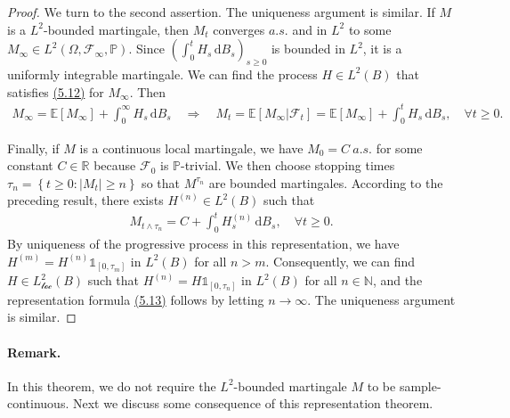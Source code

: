 \documentclass{article}
\numberwithin{equation}{section}
\newcommand{\E}{\mathbb{E}}
\renewcommand{\P}{\mathbb{P}}
\renewcommand{\d}{\mathrm{d}}
\theoremstyle{plain}
\theoremstyle{definition}
\begin{document}
\begin{proof}
We turn to the second assertion. The uniqueness argument is similar. If $M$ is a $L^2$-bounded martingale, then $M_t$ converges $a.s.$ and in $L^2$ to some $M_\infty\in L^2(\Omega,\mathscr{F}_\infty,\P)$. Since $(\int_0^t H_s\,\d B_s)_{s\geq 0}$ is bounded in $L^2$, it is a uniformly integrable martingale. We can find the process $H\in L^2(B)$ that satisfies \hyperref[eq:5.12]{(5.12)} for $M_\infty$. Then
\begin{align*}
	M_\infty = \E[M_\infty] + \int_0^\infty H_s\,\d B_s\quad\Rightarrow\quad M_t = \E[M_\infty|\mathscr{F}_t] = \E[M_\infty]+\int_0^t H_s\,\d B_s,\quad \forall t\geq 0.
\end{align*}

Finally, if $M$ is a continuous local martingale, we have $M_0=C\ a.s.$ for some constant $C\in\mathbb{R}$ because $\mathscr{F}_0$ is $\P$-trivial. We then choose stopping times $\tau_n=\left\{t\geq 0:\vert M_t\vert\geq n\right\}$ so that $M^{\tau_n}$ are bounded martingales. According to the preceding result, there exists $H^{(n)}\in L^2(B)$ such that
\begin{align*}
	M_{t\wedge\tau_n} = C + \int_0^t H^{(n)}_s\,\d B_s,\quad\forall t\geq 0.
\end{align*}
By uniqueness of the progressive process in this representation, we have $H^{(m)}=H^{(n)}\mathds{1}_{[0,\tau_m]}$ in $L^2(B)$ for all $n>m$. Consequently, we can find $H\in L^2_{\mathscr{loc}}(B)$ such that $H^{(n)}=H\mathds{1}_{[0,\tau_n]}$ in $L^2(B)$ for all $n\in\mathbb{N}$, and the representation formula \hyperref[eq:5.13]{(5.13)} follows by letting $n\to\infty$. The uniqueness argument is similar.
\end{proof}

\paragraph{Remark.} In this theorem, we do not require the $L^2$-bounded martingale $M$ to be sample-continuous. Next we discuss some consequence of this representation theorem.
\end{document}
